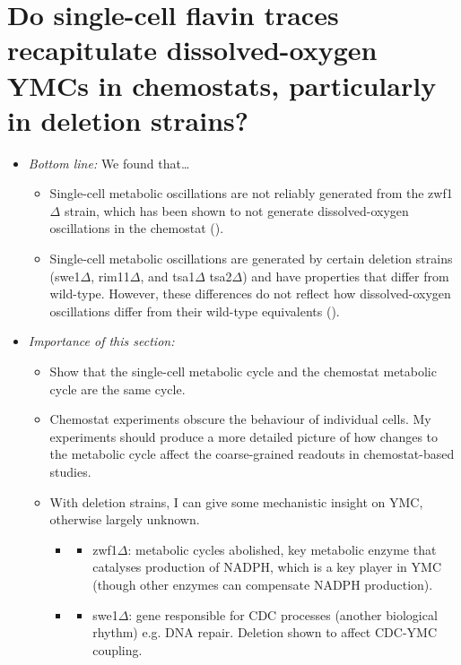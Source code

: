 \section{Do single-cell flavin traces recapitulate dissolved-oxygen YMCs in chemostats, particularly in deletion strains?}
\label{sec:biology-deletions}

\begin{itemize}
\item \emph{Bottom line:} We found that\ldots{}
\begin{itemize}
\item Single-cell metabolic oscillations are not reliably generated from the zwf1\(\Delta\) strain, which has been shown to not generate dissolved-oxygen oscillations in the chemostat (\cite{tuCyclicChangesMetabolic2007}).
\item Single-cell metabolic oscillations are generated by certain deletion strains (swe1\(\Delta\), rim11\(\Delta\), and tsa1\(\Delta\) tsa2\(\Delta\)) and have properties that differ from wild-type.  However, these differences do not reflect how dissolved-oxygen oscillations differ from their wild-type equivalents (\cite{caustonMetabolicCyclesYeast2015}).
\end{itemize}
\item \emph{Importance of this section:}
\begin{itemize}
\item Show that the single-cell metabolic cycle and the chemostat metabolic cycle are the same cycle.
\item Chemostat experiments obscure the behaviour of individual cells.  My experiments should produce a more detailed picture of how changes to the metabolic cycle affect the coarse-grained readouts in chemostat-based studies.
\item With deletion strains, I can give some mechanistic insight on YMC, otherwise largely unknown.
\begin{itemize}
\item \cite{tuCyclicChangesMetabolic2007}
\begin{itemize}
\item zwf1\(\Delta\): metabolic cycles abolished, key metabolic enzyme that catalyses production of NADPH, which is a key player in YMC (though other enzymes can compensate NADPH production).
\end{itemize}
\item \cite{caustonMetabolicCyclesYeast2015}
\begin{itemize}
\item swe1\(\Delta\): gene responsible for CDC processes (another biological rhythm) e.g. DNA repair.  Deletion shown to affect CDC-YMC coupling.

\end{itemize}
\end{itemize}
\end{itemize}
\end{itemize}
